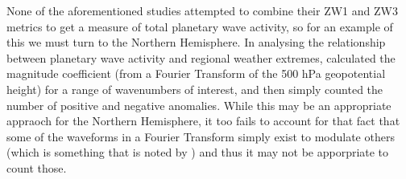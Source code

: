 None of the aforementioned studies attempted to combine their ZW1 and ZW3 metrics to get a measure of total planetary wave activity, so for an example of this we must turn to the Northern Hemisphere. In analysing the relationship between planetary wave activity and regional weather extremes, \citet{Screen2014} calculated the magnitude coefficient (from a Fourier Transform of the 500 hPa geopotential height) for a range of wavenumbers of interest, and then simply counted the number of positive and negative anomalies. While this may be an appropriate appraoch for the Northern Hemisphere, it too fails to account for that fact that some of the waveforms in a Fourier Transform simply exist to modulate others (which is something that is noted by \citet{Screen2014}) and thus it may not be apporpriate to count those.  